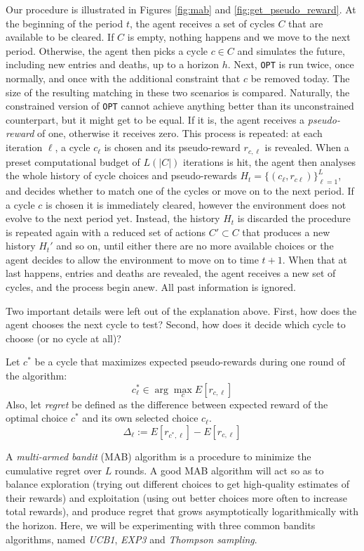 \documentclass[format=acmsmall, review=false]{acmart}
\begin{document}
Our procedure is illustrated in Figures \ref{fig:mab} and \ref{fig:get_pseudo_reward}. At the beginning of the period $t$, the agent receives a set of cycles $C$ that are available to be cleared. If $C$ is empty, nothing happens and we move to the next period. Otherwise, the agent then picks a cycle $c \in C$ and simulates the future, including new entries and deaths, up to a horizon $h$. Next, \texttt{OPT} is run twice, once normally, and once with the additional constraint that $c$ be removed today. The size of the resulting matching in these two scenarios is compared. Naturally, the constrained version of \texttt{OPT} cannot achieve anything better than its unconstrained counterpart, but it might get to be equal. If it is, the agent receives a \emph{pseudo-reward} of one, otherwise it receives zero. This process is repeated: at each iteration $\ell$, a cycle $c_{\ell}$ is chosen and its pseudo-reward $r_{c, \ell}$ is revealed. When a preset computational budget of $L(|C|)$ iterations is hit, the agent then analyses the whole history of cycle choices and pseudo-rewards $H_{t} = \{ (c_{\ell}, r_{c\ell} ) \}_{\ell=1}^{L}$, and decides whether to match one of the cycles or move on to the next period. If a cycle $c$ is chosen it is immediately cleared, however the environment does not evolve to the next period yet. Instead, the history $H_t$ is discarded the procedure is repeated again with a reduced set of actions $C' \subset C$ that produces a new history $H_t'$ and so on, until either there are no more available choices or the agent decides to allow the environment to move on to time $t+1$. When that at last happens, entries and deaths are revealed, the agent receives a new set of cycles, and the process begin anew. All past information is ignored.


Two important details were left out of the explanation above. First, how does the agent chooses the next cycle to test? Second, how does it decide which cycle to choose (or no cycle at all)? 

Let $c^{*}$ be a cycle that maximizes expected pseudo-rewards during one round of the algorithm:
$$c_{\ell}^{*} \in \arg\max_{c} E[r_{c,\ell}] $$
 Also, let \emph{regret} be defined as the difference between expected reward of the optimal choice $c^*$ and its own selected choice $c_{\ell}$.
 $$\Delta_\ell := E[r_{c^{*},\ell}] - E[r_{c,\ell}]$$
 
 A \emph{multi-armed bandit} (MAB) algorithm is a procedure to minimize the cumulative regret over $L$ rounds. A good MAB algorithm will act so as to balance exploration (trying out different choices to get high-quality estimates of their rewards) and exploitation (using out better choices more often to increase total rewards), and produce regret that grows asymptotically logarithmically with the horizon. Here, we will be experimenting with three common bandits algorithms, named \emph{UCB1}, \emph{EXP3} and \emph{Thompson sampling}.
 
\end{document}
